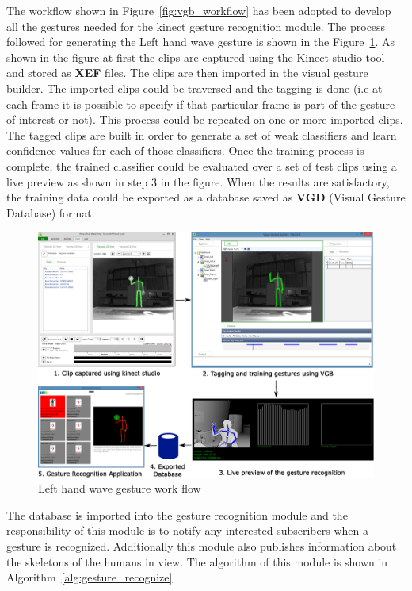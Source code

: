 The workflow shown in Figure~\ref{fig:vgb_workflow} has been adopted to develop all the gestures needed for the kinect gesture recognition module. The process followed for generating the Left hand wave gesture is shown in the Figure~\ref{fig:gesture_waveleft}. As shown in the figure at first the clips are captured using the Kinect studio tool and  stored as \textbf{XEF} files. The clips are then imported in the visual gesture builder. The imported clips could be traversed and the tagging is done (i.e at each frame it is possible to specify if that particular frame is part of the gesture of interest or not). This process could be repeated on one or more imported clips. The tagged clips are built in order to generate a set of weak classifiers and learn confidence values for each of those classifiers. Once the training process is complete, the trained classifier could be evaluated over a set of test clips using a live preview as shown in step 3 in the figure. When the results are satisfactory, the training data could be exported as a database saved as \textbf{VGD} (Visual Gesture Database) format.
\begin{figure}[H]
\centering
\includegraphics[width=\textwidth]{assets/gesture_recog_flow.eps}
\caption[Left hand wave gesture work flow]{Left hand wave gesture work flow}
\label{fig:gesture_waveleft}
\end{figure}
The database is imported into the gesture recognition module and the responsibility of this module is to notify any interested subscribers when a gesture is recognized. Additionally this module also publishes information about the skeletons of the humans in view. The algorithm of this module is shown in Algorithm~\ref{alg:gesture_recognize}

